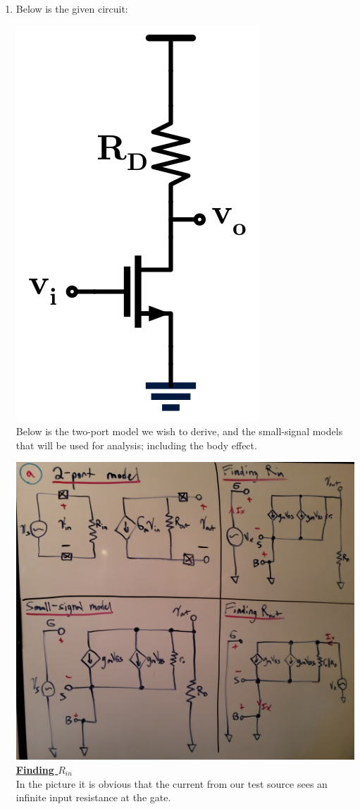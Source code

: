 \documentclass[12pt, fleqn]{article}
\begin{document}
\begin{enumerate}[label=(\alph*)]
    \item
    {
    Below is the given circuit:
    
    \includegraphics[scale=0.25, center]{p2a.png}\\
    Below is the two-port model we wish to derive, and the small-signal models that will be used for analysis; including the body effect.
    
    \includegraphics[scale=0.1, center, angle = 180]{p2a.jpg}\\
    \newpage
    \underline{\textbf{Finding $R_{in}$}}\\[0.25cm]
    In the picture it is obvious that the current from our test source sees an infinite input resistance at the gate.
    
}
\end{enumerate}
\end{document}
